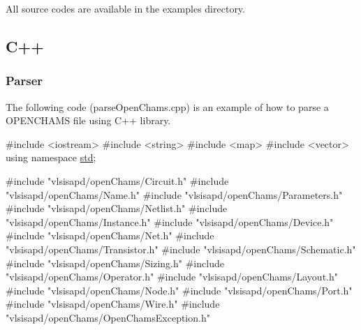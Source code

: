 All source codes are available in the {\ttfamily examples} directory.\hypertarget{openchams_openChamsC}{}\subsection{C++}\label{openchams_openChamsC}
\hypertarget{openchams_openChamsParseC}{}\subsubsection{Parser}\label{openchams_openChamsParseC}
The following code ({\ttfamily parse\+Open\+Chams.\+cpp}) is an example of how to parse a O\+P\+E\+N\+C\+H\+A\+MS file using C++ library. 
\begin{DoxyCodeInclude}
\textcolor{preprocessor}{#include <iostream>}
\textcolor{preprocessor}{#include <string>}
\textcolor{preprocessor}{#include <map>}
\textcolor{preprocessor}{#include <vector>}
\textcolor{keyword}{using namespace }\mbox{\hyperlink{namespacestd}{std}};

\textcolor{preprocessor}{#include "vlsisapd/openChams/Circuit.h"}
\textcolor{preprocessor}{#include "vlsisapd/openChams/Name.h"}
\textcolor{preprocessor}{#include "vlsisapd/openChams/Parameters.h"}
\textcolor{preprocessor}{#include "vlsisapd/openChams/Netlist.h"}
\textcolor{preprocessor}{#include "vlsisapd/openChams/Instance.h"}
\textcolor{preprocessor}{#include "vlsisapd/openChams/Device.h"}
\textcolor{preprocessor}{#include "vlsisapd/openChams/Net.h"}
\textcolor{preprocessor}{#include "vlsisapd/openChams/Transistor.h"}
\textcolor{preprocessor}{#include "vlsisapd/openChams/Schematic.h"}
\textcolor{preprocessor}{#include "vlsisapd/openChams/Sizing.h"}
\textcolor{preprocessor}{#include "vlsisapd/openChams/Operator.h"}
\textcolor{preprocessor}{#include "vlsisapd/openChams/Layout.h"}
\textcolor{preprocessor}{#include "vlsisapd/openChams/Node.h"}
\textcolor{preprocessor}{#include "vlsisapd/openChams/Port.h"}
\textcolor{preprocessor}{#include "vlsisapd/openChams/Wire.h"}
\textcolor{preprocessor}{#include "vlsisapd/openChams/OpenChamsException.h"}


\end{DoxyCodeInclude}
